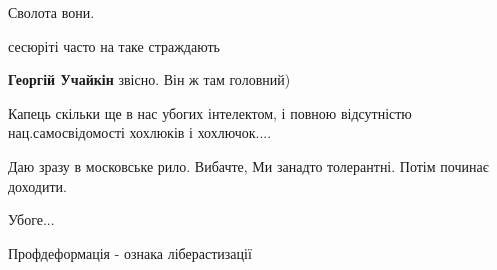 \begin{itemize}
Сволота вони.

 
сесюріті часто на таке страждають

\begin{itemize}
 
\textbf{Георгій Учайкін} звісно. Він ж там головний)
\end{itemize}

 
Капець скільки ще в нас убогих інтелектом, і повною відсутністю нац.самосвідомості хохлюків і хохлючок....

 
Даю зразу в московське рило. Вибачте, Ми занадто толерантні. Потім починає доходити.

 
Убоге...

 
Профдеформація - ознака ліберастизації

\begin{itemize}
 

\end{itemize}
\end{itemize}
